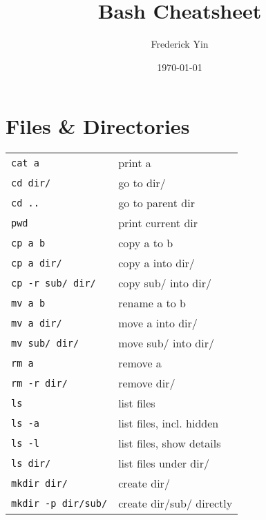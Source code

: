 \documentclass[a4paper, twocolumn]{article}
\title{Bash Cheatsheet}
\author{Frederick Yin}
\date{\today}
\renewcommand{\tt}{\texttt}
\begin{document}
\maketitle
\section{Files \& Directories}
\begin{tabular}{ll}
    \tt{cat a}              & print a                               \\
    \tt{cd dir/}            & go to dir/                            \\
    \tt{cd ..}              & go to parent dir                      \\
    \tt{pwd}                & print current dir                     \\
    \tt{cp a b}             & copy a to b                           \\
    \tt{cp a dir/}          & copy a into dir/                      \\
    \tt{cp -r sub/ dir/}    & copy sub/ into dir/                   \\
    \tt{mv a b}             & rename a to b                         \\
    \tt{mv a dir/}          & move a into dir/                      \\
    \tt{mv sub/ dir/}       & move sub/ into dir/                   \\
    \tt{rm a}               & remove a                              \\
    \tt{rm -r dir/}         & remove dir/                           \\
    \tt{ls}                 & list files                            \\
    \tt{ls -a}              & list files, incl. hidden              \\
    \tt{ls -l}              & list files, show details              \\
    \tt{ls dir/}            & list files under dir/                 \\
    \tt{mkdir dir/}         & create dir/                           \\
    \tt{mkdir -p dir/sub/}  & create dir/sub/ directly
\end{tabular}
\end{document}
